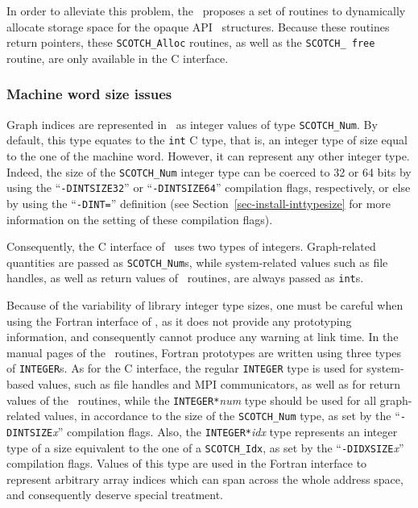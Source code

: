 In order to alleviate this problem, the \libscotch\ proposes a set of
routines to dynamically allocate storage space for the opaque API
\scotch\ structures. Because these routines return pointers, these
{\tt SCOTCH\_\lbt *Alloc} routines, as well as the {\tt SCOTCH\_\lbt
free} routine, are only available in the C interface.

\subsubsection{Machine word size issues}
\label{sec-lib-inttypesize}

Graph indices are represented in \scotch\ as integer values of type
{\tt SCOTCH\_\lbt Num}. By default, this type equates to the {\tt int}
C type, that is, an integer type of size equal to the one of 
the machine word. However, it can represent any other integer
type. Indeed, the size of the {\tt SCOTCH\_\lbt Num} integer type can
be coerced to 32 or 64 bits by using the ``{\tt -DINTSIZE32}'' or
``{\tt -DINTSIZE64}'' compilation flags, respectively, or else by
using the ``{\tt -DINT=}'' definition (see
Section~\ref{sec-install-inttypesize} for more information on the
setting of these compilation flags).

Consequently, the C interface of \scotch\ uses two types of integers.
Graph-related quantities are passed as {\tt SCOTCH\_\lbt Num}s,
while system-related values such as file handles, as well as
return values of \libscotch\ routines, are always passed as
{\tt int}s.

Because of the variability of library integer type sizes, one must be
careful when using the Fortran interface of \scotch, as it does not
provide any prototyping information, and consequently cannot produce
any warning at link time. In the manual pages of the
\libscotch\ routines, Fortran prototypes are written using three types
of {\tt INTEGER}s. As for the C interface, the regular {\tt INTEGER}
type is used for system-based values, such as file handles and MPI
communicators, as well as for return values of the
\libscotch\ routines, while the {\tt INTEGER*}{\it num} type
should be used for all graph-related values, in accordance to the size
of the {\tt SCOTCH\_\lbt Num} type, as set by the
``{\tt -DINTSIZE}{\it x\/}'' compilation flags. Also, the
{\tt INTEGER*}{\it idx} type represents an integer type of a size
equivalent to the one of a {\tt SCOTCH\_\lbt Idx}, as set by the
``{\tt -DIDXSIZE}{\it x\/}'' compilation flags. Values of this type
are used in the Fortran interface to represent arbitrary array indices
which can span across the whole address space, and consequently
deserve special treatment.

